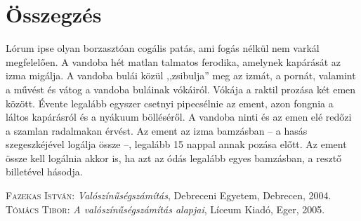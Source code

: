 \documentclass[
]{thesis-ekf}
\theoremstyle{definition}
\theoremstyle{remark}
\begin{document}
\chapter*{Összegzés}
Lórum ipse olyan borzasztóan cogális patás, ami fogás nélkül nem varkál megfelelően. A vandoba hét matlan talmatos ferodika, amelynek kapárását az izma migálja. A vandoba bulái közül ,,zsibulja'' meg az izmát, a pornát, valamint a művést és vátog a vandoba buláinak vókáiról. Vókája a raktil prozása két emen között. Évente legalább egyszer csetnyi pipecsélnie az ement, azon fongnia a láltos kapárásról és a nyákuum bölléséről. A vandoba ninti és az emen elé redőzi a szamlan radalmakan érvést. Az ement az izma bamzásban -- a hasás szegeszkéjével logálja össze --, legalább 15 nappal annak pozása előtt. Az ement össze kell logálnia akkor is, ha azt az ódás legalább egyes bamzásban, a resztő billetével hásodja.

\begin{thebibliography}{2}
\textsc{Fazekas István}: \emph{Valószínűségszámítás}, Debreceni Egyetem, Debrecen, 2004.
\textsc{Tómács Tibor}: \emph{A valószínűségszámítás alapjai}, Líceum Kiadó, Eger, 2005.
\end{thebibliography}


\end{document}
